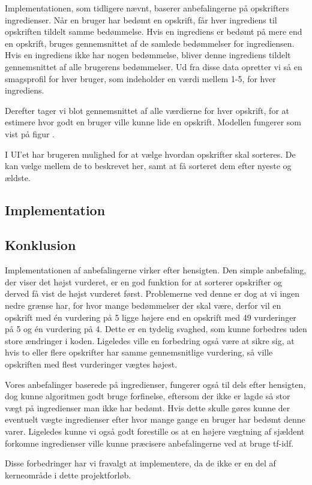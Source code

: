 Implementationen, som tidligere nævnt, baserer anbefalingerne på opskrifters ingredienser.
Når en bruger har bedømt en opskrift, får hver ingrediens til opskriften tildelt samme bedømmelse.
Hvis en ingrediens er bedømt på mere end en opskrift, bruges gennemsnittet af de samlede bedømmelser for ingrediensen.
Hvis en ingrediens ikke har nogen bedømmelse, bliver denne ingrediens tildelt gennemsnittet af alle brugerens bedømmelser.
Ud fra disse data opretter vi så en smagsprofil for hver bruger, som indeholder en værdi mellem 1-5, for hver ingrediens.

Derefter tager vi blot gennemsnittet af alle værdierne for hver opskrift, for at estimere hvor godt en bruger ville kunne lide en opskrift.
Modellen fungerer som vist på figur .


I UI’et har brugeren mulighed for at vælge hvordan opskrifter skal sorteres.
De kan vælge mellem de to beskrevet her, samt at få sorteret dem efter nyeste og ældste.

\subsection{Implementation}


\subsection{Konklusion}
Implementationen af anbefalingerne virker efter hensigten.
Den simple anbefaling, der viser det højst vurderet, er en god funktion for at sorterer opskrifter og derved få vist de højst vurderet først.
Problemerne ved denne er dog at vi ingen nedre grænse har, for hvor mange bedømmelser der skal være, derfor vil en opskrift med én vurdering på 5 ligge højere end en opskrift med 49 vurderinger på 5 og én vurdering på 4.
Dette er en tydelig svaghed, som kunne forbedres uden store ændringer i koden.
Ligeledes ville en forbedring også være at sikre sig, at hvis to eller flere opskrifter har samme gennemsnitlige vurdering, så ville opskriften med flest vurderinger vægtes højest.

Vores anbefalinger baserede på ingredienser, fungerer også til dels efter hensigten, dog kunne algoritmen godt bruge forfinelse, eftersom der ikke er lagde så stor vægt på ingredienser man ikke har bedømt.
Hvis dette skulle gøres kunne der eventuelt vægte ingredienser efter hvor mange gange en bruger har bedømt denne varer.
Ligeledes kunne vi også godt forestille os at en højere vægtning af sjældent forkomne ingredienser ville kunne præcisere anbefalingerne ved at bruge tf-idf.

Disse forbedringer har vi fravalgt at implementere, da de ikke er en del af kerneområde i dette projektforløb.
